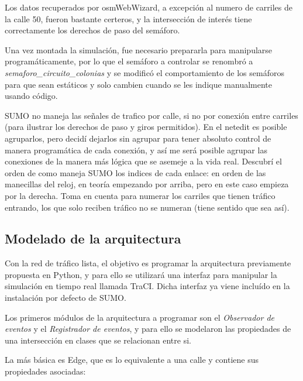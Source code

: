 Los datos recuperados por osmWebWizard, a excepción al numero de
carriles de la calle 50, fueron bastante certeros, y la intersección de
interés tiene correctamente los derechos de paso del semáforo.

Una vez montada la simulación, fue necesario prepararla para manipularse
programáticamente, por lo que el semáforo a controlar se renombró a
\emph{semaforo\_circuito\_colonias} y se modificó el comportamiento de
los semáforos para que sean estáticos y solo cambien cuando se les
indique manualmente usando código.

SUMO no maneja las señales de trafico por calle, si no por conexión
entre carriles (para ilustrar los derechos de paso y giros permitidos).
En el netedit es posible agruparlos, pero decidí dejarlos sin agrupar
para tener absoluto control de manera programática de cada conexión, y
así me será posible agrupar las conexiones de la manera más lógica que
se asemeje a la vida real. Descubrí el orden de como maneja SUMO los
indices de cada enlace: en orden de las manecillas del reloj, en teoría
empezando por arriba, pero en este caso empieza por la derecha. Toma en
cuenta para numerar los carriles que tienen tráfico entrando, los que
solo reciben tráfico no se numeran (tiene sentido que sea así).

\hypertarget{modelado-de-la-arquitectura}{%
\subsection{Modelado de la
arquitectura}\label{modelado-de-la-arquitectura}}

Con la red de tráfico lista, el objetivo es programar la arquitectura
previamente propuesta en Python, y para ello se utilizará una interfaz
para manipular la simulación en tiempo real llamada TraCI. Dicha
interfaz ya viene incluído en la instalación por defecto de SUMO.

Los primeros módulos de la arquitectura a programar son el
\emph{Observador de eventos} y el \emph{Registrador de eventos}, y para
ello se modelaron las propiedades de una intersección en clases que se
relacionan entre si.

La más básica es Edge, que es lo equivalente a una calle y contiene sus
propiedades asociadas:


